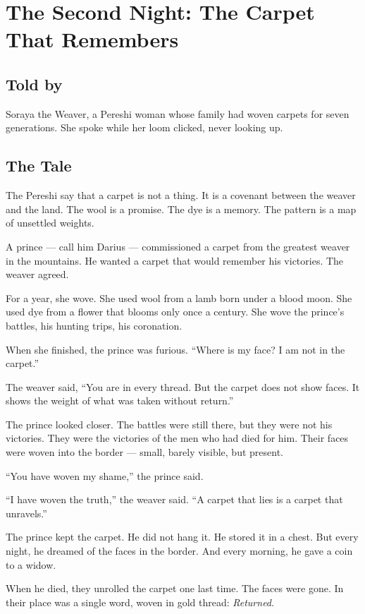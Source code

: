 \documentclass[10pt,twoside]{book}
\begin{document}
\chapter{The Second Night: The Carpet That Remembers}

\section*{Told by}
Soraya the Weaver, a Pereshi woman whose family had woven carpets for seven generations. She spoke while her loom clicked, never looking up.

\section*{The Tale}
The Pereshi say that a carpet is not a thing. It is a covenant between the weaver and the land. The wool is a promise. The dye is a memory. The pattern is a map of unsettled weights.

A prince --- call him Darius --- commissioned a carpet from the greatest weaver in the mountains. He wanted a carpet that would remember his victories. The weaver agreed.

For a year, she wove. She used wool from a lamb born under a blood moon. She used dye from a flower that blooms only once a century. She wove the prince's battles, his hunting trips, his coronation.

When she finished, the prince was furious. ``Where is my face? I am not in the carpet.''

The weaver said, ``You are in every thread. But the carpet does not show faces. It shows the weight of what was taken without return.''

The prince looked closer. The battles were still there, but they were not his victories. They were the victories of the men who had died for him. Their faces were woven into the border --- small, barely visible, but present.

``You have woven my shame,'' the prince said.

``I have woven the truth,'' the weaver said. ``A carpet that lies is a carpet that unravels.''

The prince kept the carpet. He did not hang it. He stored it in a chest. But every night, he dreamed of the faces in the border. And every morning, he gave a coin to a widow.

When he died, they unrolled the carpet one last time. The faces were gone. In their place was a single word, woven in gold thread: \textit{Returned}.
\end{document}
